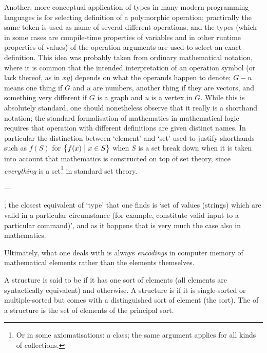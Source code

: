 \documentclass{mtmtcl}
\theoremstyle{plain}
\theoremstyle{remark}
\begin{document}
Another, more conceptual application of types in many modern 
programming languages is for selecting definition of a polymorphic 
operation; practically the same token is used as name of several 
different operations, and the types (which in some cases are 
compile-time properties of variables and in other runtime properties 
of values) of the operation arguments are used to select an exact 
definition. This idea was probably taken from ordinary mathematical 
notation, where it is common that the intended interpretation of an 
operation symbol (or lack thereof, as in $xy$) depends on what the 
operands happen to denote; $G-u$ means one thing if $G$ and $u$ are 
numbers, another thing if they are vectors, and something very 
different if $G$ is a graph and $u$ is a vertex in $G$. While this 
is absolutely standard, one should nonetheless observe that it really 
is a shorthand notation; the standard formalisation of mathematics in 
mathematical logic requires that operation with different definitions 
are given distinct names. In particular the distinction between 
`element' and `set' used to justify shorthands such as $f(S)$ for 
$\left\{ f(x) \bigm\vert x \in S\right\}$ when $S$ is a set break 
down when it is taken into account that mathematics is constructed on 
top of set theory, since \emph{everything} is a set\footnote{Or in 
some axiomatisations: a class; the same argument applies for all 
kinds of collections.} in standard set theory. 

---


; the closest equivalent of `type' that one finds is 
`set of values (strings) which are valid in a particular circumstance 
(for example, constitute valid input to a particular command)', and 
as it happens that is very much the case also in mathematics.

Ultimately, what one deals with is always \emph{encodings} in computer 
memory of mathematical elements rather than the elements 
themselves. 


\begin{definition}
  A structure is said to be  if it has one sort 
  of elements (all elements are syntactically equivalent) and 
   otherwise. A structure is 
   if it is single-sorted or multiple-sorted but 
  comes with a distinguished sort of element (the  
  sort). The  of a structure is 
  the set of elements of the principal sort.
\end{definition}
\end{document}
